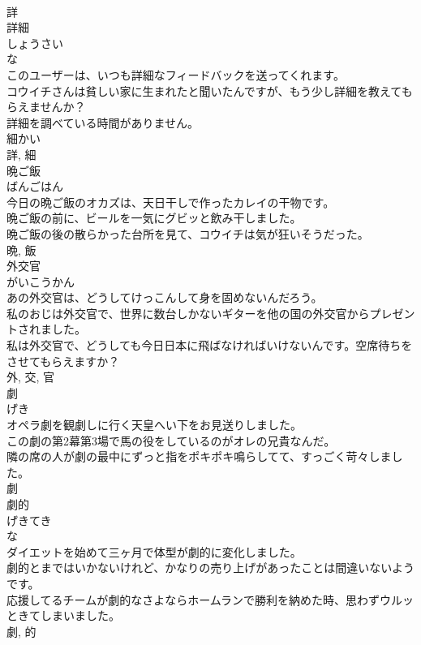\documentclass[8pt]{extreport}
\begin{document}
\begin{CJK}{UTF8}{min}
\\	詳	
\\	詳細	
\\	しょうさい	
\\	な 
\\	このユーザーは、いつも詳細なフィードバックを送ってくれます。	
\\	コウイチさんは貧しい家に生まれたと聞いたんですが、もう少し詳細を教えてもらえませんか？	
\\	詳細を調べている時間がありません。	
\\	細かい 
\\	詳, 細	
\\	晩ご飯	
\\	ばんごはん	
\\	今日の晩ご飯のオカズは、天日干しで作ったカレイの干物です。	
\\	晩ご飯の前に、ビールを一気にグビッと飲み干しました。	
\\	晩ご飯の後の散らかった台所を見て、コウイチは気が狂いそうだった。	
\\	晩, 飯	
\\	外交官	
\\	がいこうかん	
\\	あの外交官は、どうしてけっこんして身を固めないんだろう。	
\\	私のおじは外交官で、世界に数台しかないギターを他の国の外交官からプレゼントされました。	
\\	私は外交官で、どうしても今日日本に飛ばなければいけないんです。空席待ちをさせてもらえますか？	
\\	外, 交, 官	
\\	劇	
\\	げき	
\\	オペラ劇を観劇しに行く天皇へい下をお見送りしました。	
\\	この劇の第2幕第3場で馬の役をしているのがオレの兄貴なんだ。	
\\	隣の席の人が劇の最中にずっと指をポキポキ鳴らしてて、すっごく苛々しました。	
\\	劇	
\\	劇的	
\\	げきてき	
\\	な 
\\	ダイエットを始めて三ヶ月で体型が劇的に変化しました。	
\\	劇的とまではいかないけれど、かなりの売り上げがあったことは間違いないようです。	
\\	応援してるチームが劇的なさよならホームランで勝利を納めた時、思わずウルッときてしまいました。	
\\	劇, 的	

\end{CJK}
\end{document}
